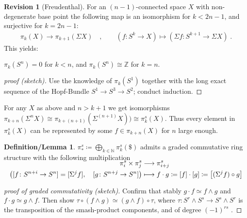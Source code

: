 \documentclass[english]{scrartcl}
\theoremstyle{definition}
\newtheorem*{DefLem}{Definition/Lemma}
\newtheorem*{Rev}{Revision}
\theoremstyle{remark}
\newcommand*{\N}{\mathds{N}}
\newcommand*{\Z}{\mathds{Z}}
\newcommand*{\longto}{\longrightarrow}
\newcommand*{\htpic}{\simeq}
\newcommand*{\smashed}{\wedge}
\newcommand*{\susp}{\Sigma}  %
\newcommand*{\Sph}[1]{\ensuremath{S^{#1}}} %
\newcommand*{\SphS}{\ensuremath{\$}} %
\begin{document}
\begin{Rev}[Freudenthal]
  For an $(n-1)$-connected space $X$ with non-degenerate base point
  the following map
  is an isomorphism for $k<2n-1$, and surjective for $k=2n-1$: 
  \begin{gather*}
    \pi_k(X) \longto \pi_{k+1}(\susp X)
    \quad,\qquad
    \left( f\colon \Sph k \to X \right) \longmapsto
    \left( \susp f\colon \Sph{k+1}\to \susp X \right)
    \;.
  \end{gather*}
  This yields:
  \begin{description}[font=\normalfont\itshape]
  \item[(Homotopy groups of spheres)]
    $\pi_k(\Sph n)=0$ for $k<n$, and
    $\pi_k(\Sph n)\cong\Z$ for $k=n$.
    \begin{proof}[proof (sketch)]
      Use the knowledge of $\pi_k(\Sph 1)$ together with the long exact
      sequence of the Hopf-Bundle $\Sph1\to\Sph3\to\Sph2$; conduct induction.
    \end{proof}
  \item[(Stabilisation of stable htpy grps)]
    For any $X$ as above and $n>k+1$ we get isomorphisms
    $\pi_{k+n}(\susp^n X)
    \cong \pi_{k+(n+1)}(\susp^{(n+1)} X))
    \cong \pi_k^s(X)$.
    Thus every element in $\pi_k^s(X)$ can be represented by some
    $f\in\pi_{k+n}(X)$ for $n$ large enough.
  \end{description}
\end{Rev}


\begin{DefLem}
  $\pi_*^s \coloneqq \bigoplus_{k\in\N} \pi_k^s(\SphS)$ admits a graded
  commutative ring structure with the following multiplication
  \begin{align*}
    \SwapAboveDisplaySkip
    \pi_i^s \times \pi_j^s
    &\longto \pi_{i+j}^s\\
    \left(
    [f\colon \Sph{n+i}\to\Sph{n}] = [\susp^{j} f], \quad
    [g\colon\Sph{n+j}\to\Sph{n}]
    \right)
    &\longmapsto f\cdot g \coloneqq [f]\cdot [g] \coloneqq \left[(\susp^j f) \circ g\right]
  \end{align*}
  \begin{proof}[proof of graded commutativity (sketch)]
    Confirm that stably
    $g\cdot f\htpic f\smashed g$ and
    $f\cdot g\htpic g\smashed f$.
    Then show $\tau\circ (f\smashed g)\htpic (g\smashed f)\circ\tau$,
    where $\tau\colon \Sph r\smashed \Sph s\to \Sph s\smashed \Sph r$ is the
    transposition of the smash-product components, and of degree $(-1)^{rs}$
    \cite[see][Prop.\,4.56]{hatcher}.
  \end{proof}
\end{DefLem}
\end{document}
